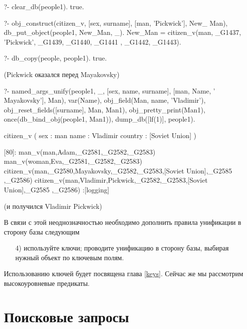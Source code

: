\documentclass[a4paper]{book}
\begin{document}
\begin{example}{}{}
?- clear_db(people1).
true.

?- obj_construct(citizen_v, [sex, surname], [man, 'Pickwick'], New_
Man), db_put_object(people1, New_Man, _).
New_Man = citizen_v(man, _G1437, 'Pickwick', _G1439, _G1440, _G1441
, _G1442, _G1443).                                                

?- db_copy(people, people1).
true.
\end{example}

(Pickwick оказался перед Mayakovsky)

\begin{example}{}{}
?- named_args_unify(people1, _, 
      [sex, name, surname], [man, Name, ' Mayakovsky'], Man), 
   var(Name), 
   obj_field(Man, name, 'Vladimir'), 
   obj_reset_fields([surname], Man, Man1), 
   obj_pretty_print(Man1), 
   once(db_bind_obj(people1, Man1)), 
   dump_db([lf(1)], people1).

citizen_v ( 
  sex : man 
  name : Vladimir 
  country : [Soviet Union] 
) 

[80]: man_v(man,Adam,_G2581,_G2582,_G2583) 
man_v(woman,Eva,_G2581,_G2582,_G2583) 
citizen_v(man,_G2580,Mayakovsky,_G2582,_G2583,[Soviet Union],_G2585
,_G2586)                                                          
citizen_v(man,Vladimir,Pickwick,_G2582,_G2583,[Soviet Union],_G2585
,_G2586)                                                          
 :[logging]
\end{example}

(и получился Vladimir Pickwick)

В связи с этой неоднозначностью необходимо дополнить правила
унификации в сторону базы следующим

\begin{itemize}
\item[4)] используйте ключи; проводите унификацию в сторону базы,
  выбирая нужный объект по ключевым полям.
\end{itemize}

Использованию ключей будет посвящена глава \ref{keys}. Сейчас же
мы рассмотрим высокоуровневые предикаты. 

\section{Поисковые запросы}
\end{document}
